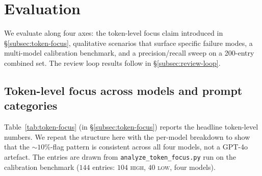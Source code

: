\section{Evaluation}
\label{sec:evaluation}

We evaluate \eps along four axes: the token-level focus claim
introduced in \S\ref{subsec:token-focus}, qualitative scenarios that
surface specific failure modes, a multi-model calibration benchmark,
and a precision/recall sweep on a 200-entry combined set. The review
loop results follow in \S\ref{subsec:review-loop}.

\subsection{Token-level focus across models and prompt categories}
\label{subsec:token-eval}

Table~\ref{tab:token-focus} (in \S\ref{subsec:token-focus}) reports
the headline token-level numbers. We repeat the structure here with
the per-model breakdown to show that the $\sim 10\%$-flag pattern is
consistent across all four models, not a GPT-4o artefact. The entries
are drawn from \texttt{analyze\_token\_focus.py} run on the
calibration benchmark ($144$ entries: $104$ \textsc{high}, $40$
\textsc{low}, four models).


